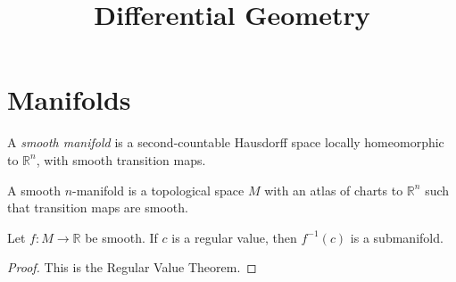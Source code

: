 



\title{Differential Geometry}
\maketitle

\label{section-phantom}

\tableofcontents

\section{Manifolds}
\label{section-manifolds}

\noindent
A \emph{smooth manifold} is a second-countable Hausdorff space locally homeomorphic to $\mathbb{R}^n$, with smooth transition maps.

\begin{definition}
\label{definition-manifold}
A smooth $n$-manifold is a topological space $M$ with an atlas of charts to $\mathbb{R}^n$ such that transition maps are smooth.
\end{definition}

\begin{lemma}
\label{lemma-regular-level-set}
Let $f : M \to \mathbb{R}$ be smooth. If $c$ is a regular value, then $f^{-1}(c)$ is a submanifold.
\end{lemma}

\begin{proof}
This is the Regular Value Theorem.
\end{proof}






